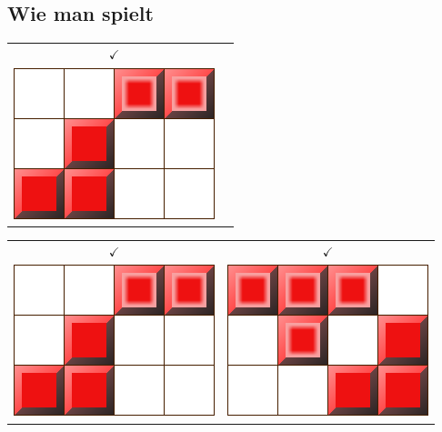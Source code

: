 \documentclass[12pt]{beamer}
\begin{document}
\subsection{Wie man spielt}
\begin{frame}
	\begin{tabular}{c c}
		\huge \color{green} $\checkmark$ & \\
		\includegraphics[width=0.5\linewidth]{media/how2play2.png}
		&
	\end{tabular}
\end{frame}
\begin{frame}
	\begin{tabular}{c c}
		\huge \color{green} $\checkmark$ & \huge \color{green} $\checkmark$\\
		\includegraphics[width=0.5\linewidth]{media/how2play2.png}
		&
		\includegraphics[width=0.5\linewidth]{media/how2play3.png}
	\end{tabular}
\end{frame}
\end{document}
